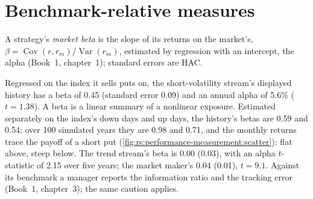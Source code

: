 \section{Benchmark-relative measures}

\begin{definition}\label{def:rs:performance-measurement:beta}
A strategy's \emph{market beta} is the slope of its returns on the market's, $\beta = \operatorname{Cov}(r, r_m)/\operatorname{Var}(r_m)$,
estimated by regression with an intercept, the alpha (Book~1, chapter~1); standard errors are HAC.
\end{definition}

Regressed on the index it sells puts on, the short-volatility stream's displayed history has a beta of 0.45 (standard error 0.09) and an annual alpha of 5.6\%
($t = 1.38$). A beta is a linear summary of a nonlinear exposure. Estimated separately on the index's down days and up days, the history's betas are 0.59 and
0.54; over 100 simulated years they are 0.98 and 0.71, and the monthly returns trace the payoff of a short put (\cref{fig:rs:performance-measurement:scatter}):
flat above, steep below. The trend stream's beta is 0.00 (0.03), with an alpha $t$-statistic of 2.15 over five years; the market maker's 0.04 (0.01), $t =
9.1$. Against its benchmark a manager reports the information ratio and the tracking error (Book~1, chapter~3); the same caution applies.

\begin{omfigure}

\label{fig:rs:performance-measurement:scatter}
\end{omfigure}

